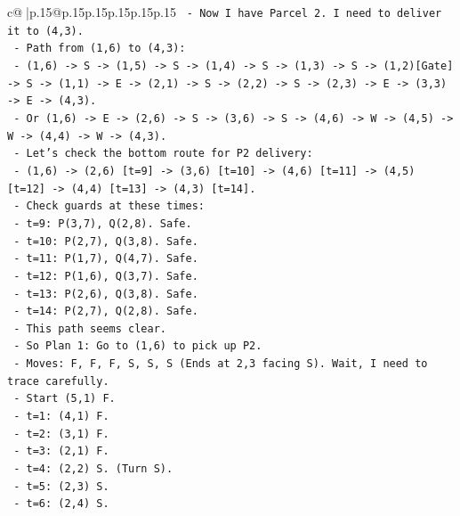 \documentclass{article}
\begin{document}
{\begin{supertabular}{c@{$\;$}|p{.15\linewidth}@{}p{.15\linewidth}p{.15\linewidth}p{.15\linewidth}p{.15\linewidth}p{.15\linewidth}}
{{{\texttt{            {-} Now I have Parcel 2. I need to deliver it to (4,3).} \\
\texttt{            {-} Path from (1,6) to (4,3):} \\
\texttt{              {-} (1,6) {-}> S {-}> (1,5) {-}> S {-}> (1,4) {-}> S {-}> (1,3) {-}> S {-}> (1,2){[}Gate{]} {-}> S {-}> (1,1) {-}> E {-}> (2,1) {-}> S {-}> (2,2) {-}> S {-}> (2,3) {-}> E {-}> (3,3) {-}> E {-}> (4,3).} \\
\texttt{              {-} Or (1,6) {-}> E {-}> (2,6) {-}> S {-}> (3,6) {-}> S {-}> (4,6) {-}> W {-}> (4,5) {-}> W {-}> (4,4) {-}> W {-}> (4,3).} \\
\texttt{              {-} Let's check the bottom route for P2 delivery:} \\
\texttt{                {-} (1,6) {-}> (2,6) {[}t=9{]} {-}> (3,6) {[}t=10{]} {-}> (4,6) {[}t=11{]} {-}> (4,5) {[}t=12{]} {-}> (4,4) {[}t=13{]} {-}> (4,3) {[}t=14{]}.} \\
\texttt{                {-} Check guards at these times:} \\
\texttt{                  {-} t=9: P(3,7), Q(2,8). Safe.} \\
\texttt{                  {-} t=10: P(2,7), Q(3,8). Safe.} \\
\texttt{                  {-} t=11: P(1,7), Q(4,7). Safe.} \\
\texttt{                  {-} t=12: P(1,6), Q(3,7). Safe.} \\
\texttt{                  {-} t=13: P(2,6), Q(3,8). Safe.} \\
\texttt{                  {-} t=14: P(2,7), Q(2,8). Safe.} \\
\texttt{                {-} This path seems clear.} \\
\texttt{            {-} So Plan 1: Go to (1,6) to pick up P2.} \\
\texttt{              {-} Moves: F, F, F, S, S, S (Ends at 2,3 facing S). Wait, I need to trace carefully.} \\
\texttt{              {-} Start (5,1) F.} \\
\texttt{              {-} t=1: (4,1) F.} \\
\texttt{              {-} t=2: (3,1) F.} \\
\texttt{              {-} t=3: (2,1) F.} \\
\texttt{              {-} t=4: (2,2) S. (Turn S).} \\
\texttt{              {-} t=5: (2,3) S.} \\
\texttt{              {-} t=6: (2,4) S.} \\
}}}
\end{supertabular}}
\end{document}
